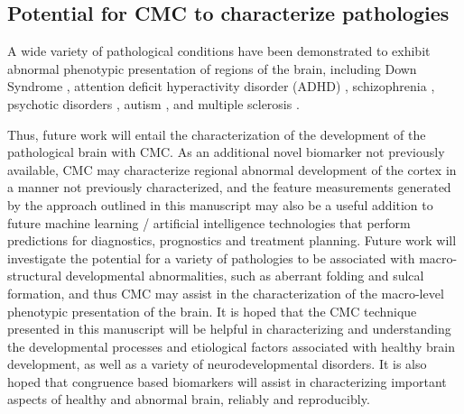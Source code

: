 \documentclass{article}
\begin{document}
\subsection{Potential for CMC to characterize pathologies}

A wide variety of pathological conditions have been demonstrated to exhibit
abnormal phenotypic presentation of regions of the brain, including Down
Syndrome \citep{levmanStructuralMagneticResonance2019}, attention deficit
hyperactivity disorder (ADHD)
\citep{listonAtypicalPrefrontalConnectivity2011,stanleyEvidenceDevelopmentalAlterations2008},
schizophrenia
\citep{innocentiSchizophreniaNeurodevelopmentCorpus2003,keshavanSchizophreniaDueExcessive1994,feinbergCorticalPruningDevelopment1990,hoffmanCorticalPruningDevelopment1989,rimolCorticalThicknessSubcortical2010,narrMappingCorticalThickness2005,venkatasubramanianAutomatedMRIParcellation2008,vanharenChangesCorticalThickness2011,schultzReducedCorticalThickness2010,nesvagRegionalThinningCerebral2008,seitzAlterationGrayMatter2018,qiuHippocampalcorticalStructuralConnectivity2010,johnsonHippocampalShapeAbnormalities2013,mackinleyDeviantCorticalSulcation2020},
psychotic disorders \citep{bakkerCorticalMorphologyDifferences2016}, autism
\citep{khundrakpamCorticalThicknessAbnormalities2017,pereiraDifferencesCorticalStructure2018,zielinskiLongitudinalChangesCortical2014,levmanStructuralMagneticResonance2019,levmanClinicallyDetectableStructural2021},
and multiple sclerosis
\citep{brexLongitudinalStudyAbnormalities2002,losseffProgressiveCerebralAtrophy1996,chenRelatingNeocorticalPathology2004,sailerFocalThinningCerebral2003,levmanClinicallyDetectableStructural2021}.

Thus, future work will entail the characterization of the development of the
pathological brain with CMC\@. As an additional novel biomarker not previously
available, CMC may characterize regional abnormal development of the cortex
in a manner not previously characterized, and the feature measurements
generated by the approach outlined in this manuscript may also be a useful
addition to future machine learning / artificial intelligence technologies
that perform predictions for diagnostics, prognostics and treatment planning.
Future work will investigate the potential for a variety of pathologies to be
associated with macro-structural developmental abnormalities, such as
aberrant folding and sulcal formation, and thus CMC may assist in the
characterization of the macro-level phenotypic presentation of the brain. It
is hoped that the CMC technique presented in this manuscript will be helpful
in characterizing and understanding the developmental processes and
etiological factors associated with healthy brain development, as well as a
variety of neurodevelopmental disorders. It is also hoped that congruence
based biomarkers will assist in characterizing important aspects of healthy
and abnormal brain, reliably and reproducibly.
\end{document}
